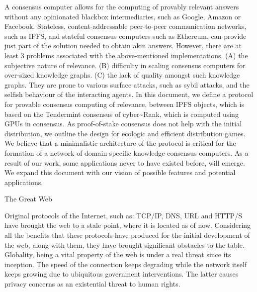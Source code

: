 \documentclass[8pt,oneside]{amsart}
\title{\fontsize{16}{17}\selectfont\textnormal{\MakeLowercase{\play{cyber: \uppercase{C}omputing the knowledge of the \uppercase{G}reat \uppercase{W}eb}}}}
\author{\fontsize{8}{9}\selectfont{
    \MakeLowercase{
    @xhipster \& @litvintech as of \today
    }
  }
}
\makeatletter
\renewcommand\subsection{\@startsection{subsection}
                                    {2}{\z@}
                                    {-3.25ex\@plus -1ex \@minus -.2ex}
                                    {0ex \@plus .2ex}
                                    {\play\Large}
                        }
\newcommand{\titleSection}[1]{\subsection{#1}}
\newenvironment{Figure}
  {\par\medskip\noindent\minipage{\linewidth}}
  {\endminipage\par\medskip}
\providecommand\abstractname{Abstract}
\renewenvironment{abstract}{%
  \centering\normalfont
  \list{}{\leftmargin2.1cm \rightmargin\leftmargin}
  {\par\noindent{\normalfont\abstractname.}}
  \item\relax
}{

  \endlist \par\bigskip
}
\makeatother
\begin{document}
\maketitle
\selectfont
\raggedbottom
\justifying

\vspace{-3em}{
\begin{Figure}
\medskip
\centering
\texttt{[image: graph.png]}
\medskip
\end{Figure}
}

\begin{abstract}

A consensus computer allows for the computing of provably relevant answers without any opinionated blackbox intermediaries, such as Google, Amazon or Facebook. Stateless, content-addressable peer-to-peer communication networks, such as IPFS, and stateful consensus computers such as Ethereum, can provide just part of the solution needed to obtain akin answers. However, there are at least 3 problems associated with the above-mentioned implementations. (A) the subjective nature of relevance. (B) difficulty in scaling consensus computers for over-sized knowledge graphs. (C) the lack of quality amongst such knowledge graphs. They are prone to various surface attacks, such as sybil attacks, and the selfish behaviour of the interacting agents. In this document, we define a protocol for provable consensus computing of relevance, between IPFS objects, which is based on the Tendermint consensus of cyber\~{}Rank, which is computed using GPUs in consensus. As proof-of-stake consensus does not help with the initial distribution, we outline the design for ecologic and efficient distribution games. We believe that a minimalistic architecture of the protocol is critical for the formation of a network of domain-specific knowledge consensus computers. As a result of our work, some applications never to have existed before, will emerge. We expand this document with our vision of possible features and potential applications.
\end{abstract}

\titleSection{The Great Web}\label{great-web}

Original protocols of the Internet, such as: TCP/IP, DNS, URL and HTTP/S have brought the web to a stale point, where it is located as of now. Considering all the benefits that these protocols have produced for the initial development of the web, along with them, they have brought significant obstacles to the table. Globality, being a vital property of the web is under a real threat since its inception. The speed of the connection keeps degrading while the network itself keeps growing due to ubiquitous government interventions. The latter causes privacy concerns as an existential threat to human rights.
\end{document}
